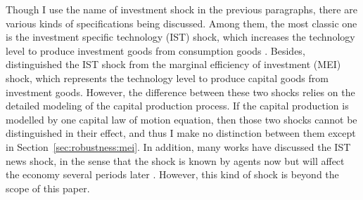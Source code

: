 Though I use the name of investment shock in the previous paragraphs, there are various kinds of specifications being discussed. Among them, the most classic one is the investment specific technology (IST) shock, which increases the technology level to produce investment goods from consumption goods \citep{greenwoodLongRunImplicationsInvestmentSpecific1997a, fisherDynamicEffectsNeutral2006, justinianoInvestmentShocksBusiness2010}. Besides, \cite{justinianoInvestmentShocksRelative2011, kamberFinancialFrictionsRole2015} distinguished the IST shock from the marginal efficiency of investment (MEI) shock, which represents the technology level to produce capital goods from investment goods. However, the difference between these two shocks relies on the detailed modeling of the capital production process. If the capital production is modelled by one capital law of motion equation, then those two shocks cannot be distinguished in their effect, and thus I make no distinction between them except in Section~\ref{sec:robustness:mei}. In addition, many works have discussed the IST news shock, in the sense that the shock is known by agents now but will affect the economy several periods later \citep{schmitt-groheWhatsNewsBusiness2012, benzeevInvestmentSpecificNewsShocks2015, liaoNewsShocksInvestmentspecific2023}. However, this kind of shock is beyond the scope of this paper.

